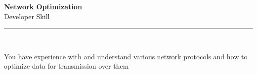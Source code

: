 \documentclass[11pt,a4paper]{memoir}
\begin{document}
    \begin{Spacing}{0.75}%
        \noindent
        \Large
        \textbf{Network Optimization}\\[3pt]
        \scriptsize\color{gray}Developer Skill\\ 
        \rule{\textwidth}{.3mm}\\
        
        \vspace{3mm}
        \noindent
        \begin{minipage}[t]{53mm}
            \begin{flushleft}
            {
                \normalsize
                \begin{Spacing}{1}%
                \color{black}\textrm{You have experience with and understand various network protocols and how to optimize data for transmission over them}\\
                \end{Spacing}
            }
            \end{flushleft}
        \end{minipage}

        \vspace{5mm}
        \noindent
        \begin{minipage}[t]{53mm}
            \begin{flushleft}
            {
                \normalsize
                \begin{Spacing}{1}%
                \color{gray}\textit{}\\
                \end{Spacing}
            }
            \end{flushleft}
        \end{minipage}
    \end{Spacing}
    \clearpage
\end{document}
